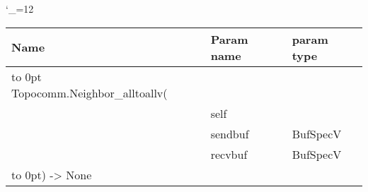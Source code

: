 \begingroup \catcode`\_=12 \tt
\begin{tabular}{lll}
\toprule
\textrm{Name}&\textrm{Param name}&\textrm{param type}\\
\midrule
\hbox to 0pt {Topocomm.Neighbor_alltoallv(\hss}\\
& self\\
& sendbuf & BufSpecV\\
& recvbuf & BufSpecV\\
\hbox to 0pt{) -> None\hss}\\
\bottomrule
\end{tabular}
\endgroup
